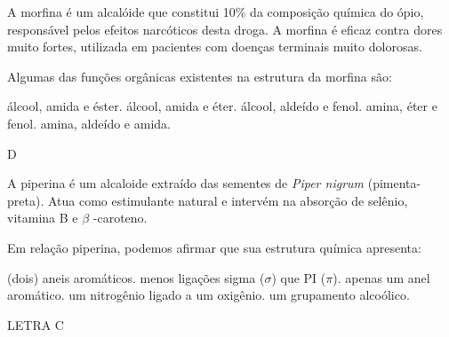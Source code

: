 \documentclass[11pt]{scrartcl}
\begin{document}
\begin{exercise}[points=1.0]
A morfina é um alcalóide que constitui 10\% da composição química do ópio, responsável pelos efeitos narcóticos desta droga. A morfina é eficaz contra dores muito fortes, utilizada em pacientes com doenças terminais muito dolorosas.
\begin{center}

\end{center}
Algumas das funções orgânicas existentes na estrutura da morfina são:
\begin{choice}
\choice álcool, amida e éster.
\choice álcool, amida e éter.
\choice álcool, aldeído e fenol.
\choice amina, éter e fenol.
\choice amina, aldeído e amida.
\end{choice}
\end{exercise}
\begin{solution}
D
\end{solution}



\begin{exercise}[points=1]
A piperina é um alcaloide extraído das sementes de \emph{Piper nigrum} (pimenta-preta). Atua como estimulante natural e intervém na absorção de selênio, vitamina B e \(\beta\) -caroteno.
\begin{center}
\end{center}

Em relação piperina, podemos afirmar que sua estrutura química apresenta:

\begin{choice}
 (dois) aneis aromáticos.
\choice menos ligações sigma (\(\sigma\)) que PI (\(\pi\)).
\choice apenas um anel aromático.
\choice um nitrogênio ligado a um oxigênio.
\choice um grupamento alcoólico.
\end{choice}
\end{exercise}
\begin{solution}
LETRA C
\end{solution}
\end{document}
